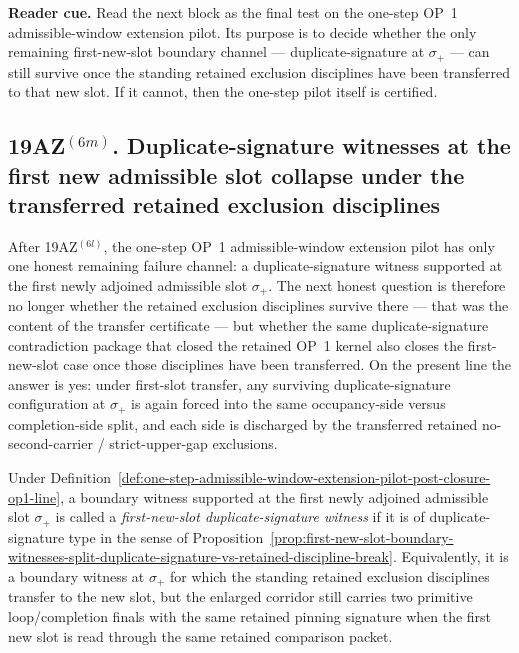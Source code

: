\noindent\textbf{Reader cue.} Read the next block as the final test on the one-step OP~1 admissible-window extension pilot. Its purpose is to decide whether the only remaining first-new-slot boundary channel --- duplicate-signature at $\sigma_{+}$ --- can still survive once the standing retained exclusion disciplines have been transferred to that new slot. If it cannot, then the one-step pilot itself is certified.

\subsection*{19AZ$^{(6m)}$. Duplicate-signature witnesses at the first new admissible slot collapse under the transferred retained exclusion disciplines}
\label{sec:duplicate-signature-witnesses-first-new-slot-collapse-under-transferred-retained-exclusion-disciplines}
After 19AZ$^{(6l)}$, the one-step OP~1 admissible-window extension pilot has only one honest remaining failure channel: a duplicate-signature witness supported at the first newly adjoined admissible slot $\sigma_{+}$. The next honest question is therefore no longer whether the retained exclusion disciplines survive there --- that was the content of the transfer certificate --- but whether the same duplicate-signature contradiction package that closed the retained OP~1 kernel also closes the first-new-slot case once those disciplines have been transferred. On the present line the answer is yes: under first-slot transfer, any surviving duplicate-signature configuration at $\sigma_{+}$ is again forced into the same occupancy-side versus completion-side split, and each side is discharged by the transferred retained no-second-carrier / strict-upper-gap exclusions.

\begin{definition}
\label{def:first-new-slot-duplicate-signature-witness-one-step-op1-extension-pilot}
Under Definition~\ref{def:one-step-admissible-window-extension-pilot-post-closure-op1-line}, a boundary witness supported at the first newly adjoined admissible slot $\sigma_{+}$ is called a \emph{first-new-slot duplicate-signature witness} if it is of duplicate-signature type in the sense of Proposition~\ref{prop:first-new-slot-boundary-witnesses-split-duplicate-signature-vs-retained-discipline-break}. Equivalently, it is a boundary witness at $\sigma_{+}$ for which the standing retained exclusion disciplines transfer to the new slot, but the enlarged corridor still carries two primitive loop/completion finals with the same retained pinning signature when the first new slot is read through the same retained comparison packet.
\end{definition}

